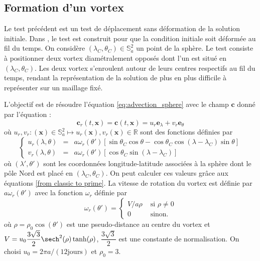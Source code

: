 \subsection{Formation d'un vortex}

Le test précédent est un test de déplacement sans déformation de la solution initiale. Dans \cite{Nair2002}, le test est construit pour que la condition initiale soit déformée au fil du temps.
On considère $(\lambda_C, \theta_C) \in \mathbb{S}_a^2$ un point de la sphère. Le test consiste à positionner deux vortex diamétralement opposés dont l'un est situé en $(\lambda_C, \theta_C)$. Les deux vortex s'enroulent autour de leurs centres respectifs au fil du temps, rendant la représentation de la solution de plus en plus difficile à représenter sur un maillage fixé.

L'objectif est de résoudre l'équation \eqref{eq:advection_sphere} avec le champ $\mathbf{c}$ donné par l'équation :
\begin{equation}
\mathbf{c}_r(t,\mathbf{x}) = \mathbf{c}(t, \mathbf{x}) = u_r \mathbf{e}_{\lambda} + v_r \mathbf{e}_{\theta}
\label{eq:rotation_vortex}
\end{equation}
où $u_r, v_r : (\mathbf{x}) \in \mathbb{S}_a^2 \mapsto u_r(\mathbf{x}), v_r(\mathbf{x}) \in \mathbb{R}$ sont des fonctions définies par
\begin{equation}
\left\lbrace
\begin{array}{rcl}
u_r(\lambda, \theta) & = & a \omega_r(\theta') \left[ \sin \theta_C \cos \theta - \cos \theta_C \cos (\lambda - \lambda_C) \sin \theta \right] \\
v_r(\lambda, \theta) & = & a \omega_r (\theta') \left[\cos \theta_C \sin (\lambda - \lambda_C)  \right]
\end{array}
\right.
\end{equation}
où $(\lambda', \theta')$ sont les coordonnées longitude-latitude associées à la sphère dont le pôle Nord est placé en $(\lambda_C, \theta_C)$. On peut calculer ces valeurs grâce aux équations \eqref{from classic to prime}.
La vitesse de rotation du vortex est définie par $a \omega_r(\theta')$ avec la fonction $\omega_r$ définie par
\begin{equation}
\omega_r(\theta') = \left\lbrace
\begin{array}{cl}
V/a\rho & \text{ si } \rho \neq 0 \\
0 & \text{ sinon.}
\end{array}
\right.
\end{equation}
où $\rho = \rho_0 \cos (\theta')$ est une pseudo-distance au centre du vortex et $V=u_0 \dfrac{3 \sqrt{3}}{2} \sech^2 (\rho) \tanh (\rho)$, $\dfrac{3 \sqrt{3}}{2}$ est une constante de normalisation. On choisi $u_0 = 2 \pi a / (12 \text{jours})$ et $\rho_0 = 3$.

